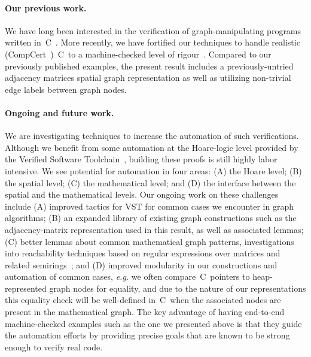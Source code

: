 \paragraph{Our previous work.} We have long been interested in
the verification of graph-manipulating programs written in~C~\cite{hobor:ramification}.
More recently, we have fortified our techniques to handle realistic (CompCert~\cite{leroy:compcert})~C~to a machine-checked level of rigour~\cite{DBLP:journals/pacmpl/WangCMH19}.  Compared to our previously published 
examples, the present result includes a previously-untried adjacency matrices spatial graph representation as well as utilizing non-trivial edge labels between graph nodes. %

\paragraph{Ongoing and future work.}
We are investigating techniques to increase the automation of such verifications.  Although
we benefit from some automation at the Hoare-logic level provided by the Verified Software
Toolchain~\cite{appel:programlogics}, building these proofs is still highly labor intensive.  We see potential
for automation in four areas: (A) the Hoare level; (B) the spatial level; (C) the mathematical level; and (D) the interface between the spatial and the mathematical levels.  Our ongoing work
on these challenges include (A) improved tactics for VST for common cases we encounter in graph
algorithms; (B) an expanded library of existing graph constructions such as the adjacency-matrix representation used in this result, as well as associated lemmas;
(C) better lemmas about common mathematical graph patterns, investigations into reachability techniques
based on regular expressions over matrices and related semirings~\cite{backhouse,DBLP:journals/jacm/Tarjan81a,dolan2013fun,krishna2017go}; and (D) improved modularity in our constructions and
automation of common cases, \emph{e.g.} we often compare~C~pointers to heap-represented graph
nodes for equality, and due to the nature of our representations this equality check will be
well-defined in~C~when the associated nodes are present in the mathematical graph.  The key
advantage of having end-to-end machine-checked examples such as the one we presented above is 
that they guide the automation efforts by providing precise goals that are known to be strong 
enough to verify real code.

